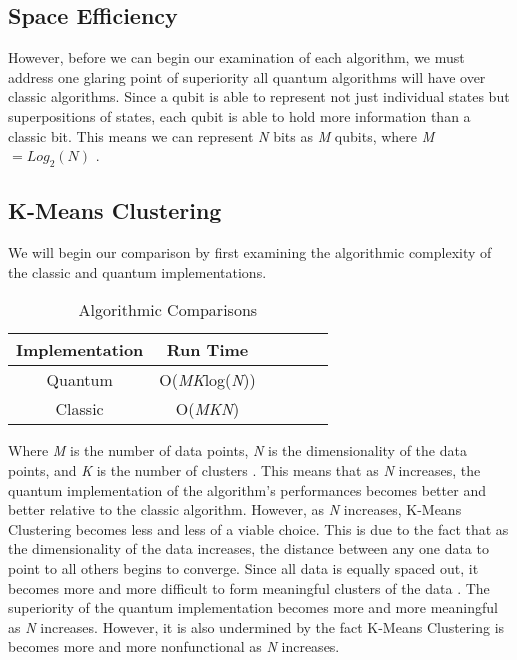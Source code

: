 \documentclass[conference]{IEEEtran}
\begin{document}
\subsection{Space Efficiency}
However, before we can begin our examination of each algorithm, we must address one glaring point of superiority all quantum algorithms will have over classic algorithms. Since a qubit is able to represent not just individual states but superpositions of states, each qubit is able to hold more information than a classic bit. This means we can represent \emph{N} bits as \emph{M} qubits, where \emph{M} $ = Log_2(N)$ \cite{b12}.
\subsection{K-Means Clustering}
We will begin our comparison by first examining the algorithmic complexity of the classic and quantum implementations. 
\begin{table}[H]
\centering
\caption{Algorithmic Comparisons}
\begin{tabular}{|c|c|c|c|c|c|}
\hline
 Implementation & Run Time   \\
\hline
Quantum & O(\emph{MK}log(\emph{N})) \\
\hline
Classic & O(\emph{MKN}) \\
\hline
\end{tabular}
\end{table}
Where \emph{M} is the number of data points, \emph{N} is the dimensionality of the data points, and \emph{K} is the number of clusters \cite{b6}. This means that as \emph{N} increases, the quantum implementation of the algorithm's performances becomes better and better relative to the classic algorithm. However, as \emph{N} increases, K-Means Clustering becomes less and less of a viable choice. This is due to the fact that as the dimensionality of the data increases, the distance between any one data to point to all others begins to converge. Since all data is equally spaced out, it becomes more and more difficult to form meaningful clusters of the data \cite{b15}. The superiority of the quantum implementation becomes more and more meaningful as \emph{N} increases. However, it is also undermined by the fact K-Means Clustering is becomes more and more nonfunctional as \emph{N} increases.  
\end{document}
